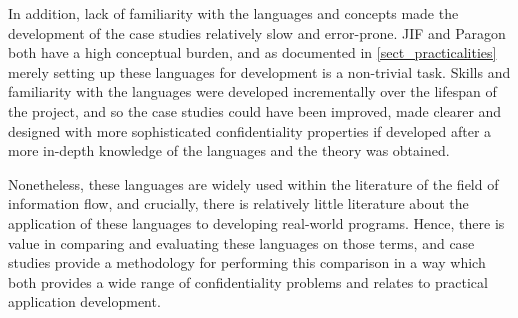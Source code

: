In addition, lack of familiarity with the languages and concepts made the development of the case studies relatively slow and error-prone. JIF and Paragon both have a high conceptual burden, and as documented in \ref{sect_practicalities} merely setting up these languages for development is a non-trivial task. Skills and familiarity with the languages were developed incrementally over the lifespan of the project, and so the case studies could have been improved, made clearer and designed with more sophisticated confidentiality properties if developed after a more in-depth knowledge of the languages and the theory was obtained.

Nonetheless, these languages are widely used within the literature of the field of information flow, and crucially, there is relatively little literature about the application of these languages to developing real-world programs. Hence, there is value in comparing and evaluating these languages on those terms, and case studies provide a methodology for performing this comparison in a way which both provides a wide range of confidentiality problems and relates to practical application development.

